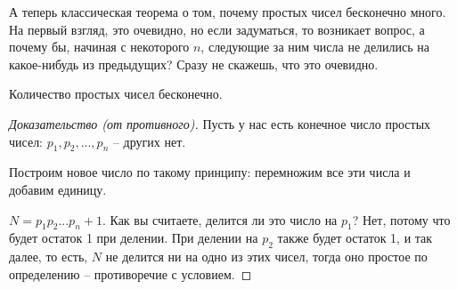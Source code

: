 \documentclass[russian]{lecture-notes}
\begin{document}
	А теперь классическая теорема о том, почему простых чисел бесконечно много. На первый взгляд, это очевидно, но если задуматься, то возникает вопрос, а почему бы, начиная с некоторого $n$, следующие за ним числа не делились на какое-нибудь из предыдущих? Сразу не скажешь, что это очевидно.
		
	\begin{theorem*}
		Количество простых чисел бесконечно. 
	\end{theorem*}
	\begin{proof} [Доказательство (от противного)]
		
		Пусть у нас есть конечное число простых чисел: $p_1, p_2, ..., p_n$ -- других нет.
			
		Построим новое число по такому принципу: перемножим все эти числа и добавим единицу. 
			
		$N = p_1p_2...p_n + 1$. Как вы считаете, делится ли это число на $p_1$? Нет, потому что будет остаток 1 при делении. При делении на $p_2$ также будет остаток 1, и так далее, то есть, $N$ не делится ни на одно из этих чисел, тогда оно простое по определению -- противоречие с условием.
	\end{proof}
	
\end{document}
